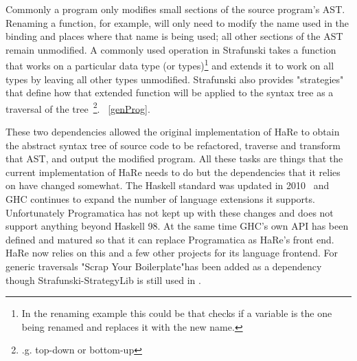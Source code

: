 Commonly \DIFdelbegin {}\DIFdelend \DIFaddbegin {}\DIFaddend a program only modifies small sections of the source program's AST. Renaming a function, for example, will only need to modify the name used in the binding and places where that name is being used; all other sections of the AST remain unmodified. A commonly used operation in Strafunski takes a function that works on a particular data type (or types)\footnote{In the renaming example this could be \DIFdelbegin {}\DIFdelend \DIFaddbegin {}\DIFaddend that checks if a variable is the one being renamed and replaces it with the new name.} and extends it to work on all types by leaving all other types unmodified. Strafunski also provides "strategies" that define how that extended function will be applied to the syntax tree as a traversal of the tree~\citep{strafunski}\footnote{\DIFdelbegin {}\DIFdelend \DIFaddbegin {}\DIFaddend .g. \DIFaddbegin {}\DIFaddend top-down or \DIFaddbegin {}\DIFaddend bottom-up\DIFaddbegin {}\DIFaddend }. \DIFdelbegin {}\DIFdelend \DIFaddbegin {}\DIFaddend ~\ref{genProg}.

These two dependencies allowed the original implementation of HaRe to obtain the abstract syntax tree of source code to be refactored, traverse and transform that AST, and output the modified program. All these tasks are things that the current implementation of HaRe needs to do but the dependencies that it relies on have changed somewhat. The Haskell standard was updated in 2010~\citep{haskell2010} and GHC continues to expand the number of language extensions it supports. Unfortunately Programatica has not kept up with these changes and does not support anything beyond Haskell 98. At the same time GHC's own API has been defined and matured so that it can replace Programatica as HaRe's front end. HaRe now relies on this and a few other projects for its language frontend. For generic traversals "Scrap Your Boilerplate"\DIFaddbegin {}\DIFaddend has been added as a dependency though Strafunski-StrategyLib is still used in \DIFdelbegin {}\DIFdelend \DIFaddbegin {}\DIFaddend .

